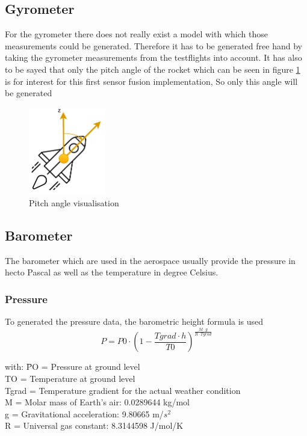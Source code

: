   \subsection{Gyrometer}
  For the gyrometer there does not really exist a model with which those measurements could be generated.
  Therefore it has to be generated free hand by taking the gyrometer measurements from the testflights into account.
  It has also to be sayed that only the pitch angle of the rocket which can be seen in figure \ref{fig:RocketPitchAngle} is for interest for this first sensor fusion implementation,
  So only this angle will be generated
  
  \begin{figure}[h!]
    \centering
    \includegraphics[width = 0.3\textwidth]{./Pictures/RocketSyMod.pdf}
    \caption{Pitch angle visualisation}
    \label{fig:RocketPitchAngle}
  \end{figure}

  
  \subsection{Barometer}
  The barometer which are used in the aerospace usually provide the pressure in hecto Pascal as well as the temperature in degree Celsius.
  \subsubsection{Pressure}
  To generated the pressure data, the barometric height formula is used %
  $$P = P0 \cdot (1- \frac{Tgrad\cdot h}{T0})^{\frac{M\cdot g}{R\cdot Tgrad}}$$
  \begin{tabbing}
  with: \= PO = Pressure at ground level \\
  \> TO = Temperature at ground level \\
  \> Tgrad = Temperature gradient for the actual weather condition \\
  \> M = Molar mass of Earth's air: 0.0289644 kg/mol\\
  \> g = Gravitational acceleration: 9.80665 m/$s^2$\\
  \> R = Universal gas constant: 8.3144598 J/mol/K\\
  \end{tabbing}

